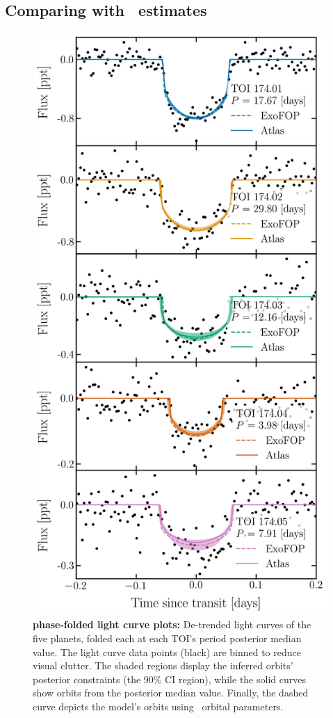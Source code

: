 \documentclass[floatfix,ApJL,twocolumn]{aastex631}
\begin{document}
\subsection{Comparing with \exofop\ estimates}

\begin{figure}\label{fig:phase}
    \centering
    \includegraphics[width=0.9\linewidth]{figures/toi_174_phase.png}
    \caption{\textbf{ phase-folded light curve plots:}
    De-trended light curves of the five  planets, folded each at each TOI's period posterior median value.
    The light curve data points (black) are binned to reduce visual clutter.
    The shaded regions display the inferred orbits' posterior constraints (the 90\% CI region), while the solid curves show orbits from the posterior median value.
    Finally, the dashed curve depicts the model's orbits using \exofop\ orbital parameters.
    }
\end{figure}
\end{document}
